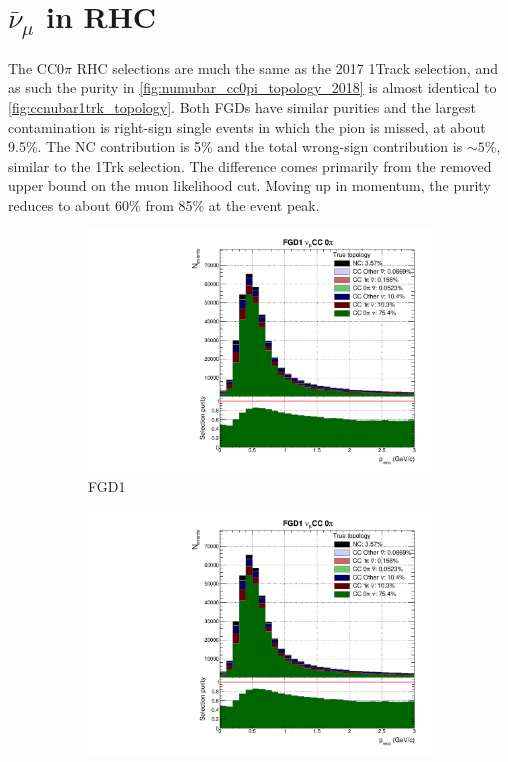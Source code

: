 \section{$\bar{\nu}_\mu$ in RHC}
The CC0$\pi$ RHC selections are much the same as the 2017 1Track selection, and as such the purity in \autoref{fig:numubar_cc0pi_topology_2018} is almost identical to \autoref{fig:ccnubar1trk_topology}. Both FGDs have similar purities and the largest contamination is right-sign single events in which the pion is missed, at about 9.5\%. The NC contribution is 5\% and the total wrong-sign contribution is $\sim5\%$, similar to the 1Trk selection. The difference comes primarily from the removed upper bound on the muon likelihood cut. Moving up in momentum, the purity reduces to about 60\% from 85\% at the event peak.
\begin{figure}[h]
	\begin{subfigure}[t]{0.49\textwidth}
		\includegraphics[width=\textwidth,page=13, trim={0mm 0mm 0mm 9mm}, clip]{figures/mach3/2018/Selection/2018_RedNDmatrix_rebin_verbose_may_noweights_diagnostics}
		\caption{FGD1}
	\end{subfigure}
	\begin{subfigure}[t]{0.49\textwidth}
		\includegraphics[width=\textwidth,page=19, trim={0mm 0mm 0mm 9mm}, clip]{figures/mach3/2018/Selection/2018_RedNDmatrix_rebin_verbose_may_noweights_diagnostics}

\end{subfigure}
\end{figure}
